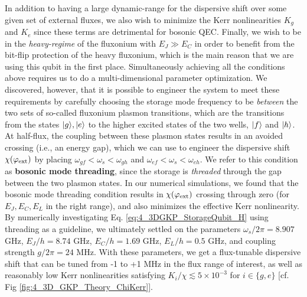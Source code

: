 In addition to having a large dynamic-range for the dispersive shift over some given set of external fluxes, we also wish to minimize the Kerr nonlinearities $K_g$ and $K_e$ since these terms are detrimental for bosonic QEC. Finally, we wish to be in the \textit{heavy-regime} of the fluxonium with $E_J \gg E_C$ in order to benefit from the bit-flip protection of the heavy fluxonium, which is the main reason that we are using this qubit in the first place. Simultaneously achieving all the conditions above requires us to do a multi-dimensional parameter optimization. We discovered, however, that it is possible to engineer the system to meet these requirements by carefully choosing the storage mode frequency to be \textit{between} the two sets of so-called fluxonium plasmon transitions, which are the transitions from the states $\lvert g\rangle, \lvert e\rangle$ to the higher excited states of the two wells, $\lvert f\rangle$ and $\lvert h\rangle$. At half-flux, the coupling between these plasmon states results in an avoided crossing (i.e., an energy gap), which we can use to engineer the dispersive shift $\chi(\varphi_{\rm ext})$ by placing $\omega_{gf} < \omega_s < \omega_{gh}$ and $\omega_{ef} < \omega_s < \omega_{eh}$. We refer to this condition as  \textbf{bosonic mode threading}, since the storage is 
\textit{threaded} through the gap between the two plasmon states. In our numerical simulations, we found that the bosonic mode threading condition results in $\chi(\varphi_{\rm ext})$ crossing through zero (for $E_J, E_C, E_L$ in the right range), and also minimizes the effective Kerr nonlinearity. By numerically investigating Eq. \eqref{eq:4_3DGKP_StorageQubit_H} using threading as a guideline, we ultimately settled on the parameters $\omega_s/2\pi = 8.907$ GHz, $E_J/h = 8.74$ GHz, $E_C/h = 1.69$ GHz, $E_L/h = 0.5$ GHz, and coupling strength $g/2\pi = 24$ MHz. With these parameters, we get a flux-tunable dispersive shift that can be tuned from -1 to +1 MHz in the flux range of interest, as well as reasonably low Kerr nonlinearities satisfying $K_i/\chi \lesssim 5\times 10^{-3}$ for $i \in \{g, e\}$ [cf. Fig \ref{fig:4_3D_GKP_Theory_ChiKerr}]. 


